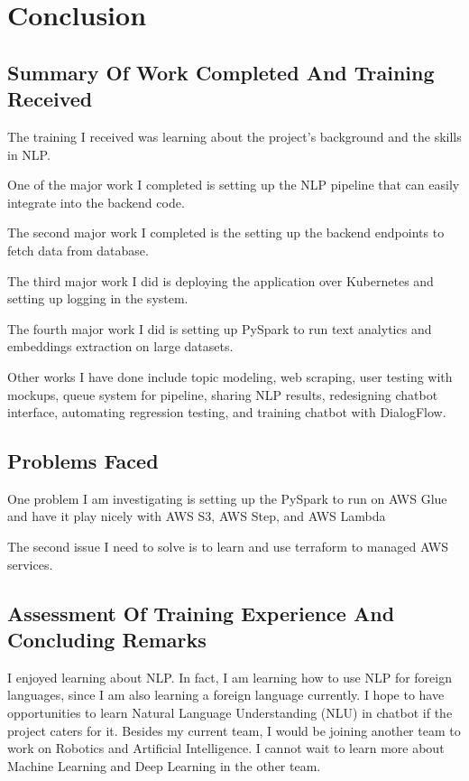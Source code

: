 \section{Conclusion}
\subsection{Summary Of Work Completed And Training Received}
\noindent
The training I received was learning about the project's background and the skills in NLP.

\noindent
One of the major work I completed is setting up the NLP pipeline that can easily integrate into the backend code.

\noindent
The second major work I completed is the setting up the backend endpoints to fetch data from database.

\noindent
The third major work I did is deploying the application over Kubernetes and setting up logging in the system.

\noindent
The fourth major work I did is setting up PySpark to run text analytics and embeddings extraction on large datasets. 

\noindent
Other works I have done include topic modeling, web scraping, user testing with mockups, queue system for pipeline, sharing NLP results, redesigning chatbot interface, automating regression testing, and training chatbot with DialogFlow.
 
\subsection{Problems Faced}
\noindent
One problem I am investigating is setting up the PySpark to run on AWS Glue and have it play nicely with AWS S3, AWS Step, and AWS Lambda

\noindent
The second issue I need to solve is to learn and use terraform to managed AWS services.

\subsection{Assessment Of Training Experience And Concluding Remarks}
\noindent
I enjoyed learning about NLP. In fact, I am learning how to use NLP for foreign languages, since I am also learning a foreign language currently. I hope to have opportunities to learn Natural Language Understanding (NLU) in chatbot if the project caters for it. Besides my current team, I would be joining another team to work on Robotics and Artificial Intelligence. I cannot wait to learn more about Machine Learning and Deep Learning in the other team.
